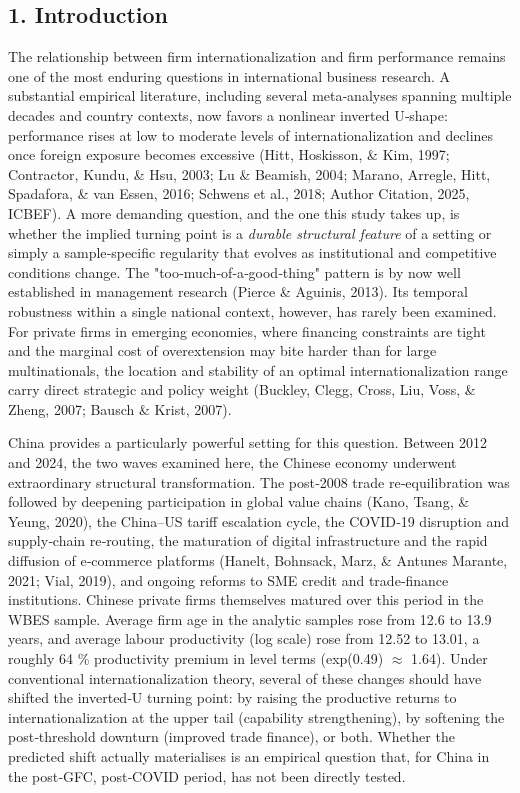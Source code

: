 \documentclass[12pt,a4paper]{article}
\begin{document}
\hypertarget{1-introduction}{%
\subsection{1. Introduction}\label{1-introduction}}

The relationship between firm internationalization and firm performance
remains one of the most enduring questions in international business
research. A substantial empirical literature, including several
meta‑analyses spanning multiple decades and country contexts, now favors
a nonlinear inverted U‑shape: performance rises at low to moderate
levels of internationalization and declines once foreign exposure
becomes excessive (Hitt, Hoskisson, \& Kim, 1997; Contractor, Kundu, \&
Hsu, 2003; Lu \& Beamish, 2004; Marano, Arregle, Hitt, Spadafora, \& van
Essen, 2016; Schwens et al., 2018; Author Citation, 2025, ICBEF). A more
demanding question, and the one this study takes up, is whether the
implied turning point is a \emph{durable structural feature} of a
setting or simply a sample‑specific regularity that evolves as
institutional and competitive conditions change. The
"too‑much‑of‑a‑good‑thing" pattern is by now well established in
management research (Pierce \& Aguinis, 2013). Its temporal robustness
within a single national context, however, has rarely been examined. For
private firms in emerging economies, where financing constraints are
tight and the marginal cost of overextension may bite harder than for
large multinationals, the location and stability of an optimal
internationalization range carry direct strategic and policy weight
(Buckley, Clegg, Cross, Liu, Voss, \& Zheng, 2007; Bausch \& Krist,
2007).

China provides a particularly powerful setting for this question.
Between 2012 and 2024, the two waves examined here, the Chinese economy
underwent extraordinary structural transformation. The post‑2008 trade
re‑equilibration was followed by deepening participation in global value
chains (Kano, Tsang, \& Yeung, 2020), the China--US tariff escalation
cycle, the COVID‑19 disruption and supply‑chain re‑routing, the
maturation of digital infrastructure and the rapid diffusion of
e‑commerce platforms (Hanelt, Bohnsack, Marz, \& Antunes Marante, 2021;
Vial, 2019), and ongoing reforms to SME credit and trade‑finance
institutions. Chinese private firms themselves matured over this period
in the WBES sample. Average firm age in the analytic samples rose from
12.6 to 13.9 years, and average labour productivity (log scale) rose
from 12.52 to 13.01, a roughly 64 \% productivity premium in level terms
(exp(0.49) \(\approx\) 1.64). Under conventional internationalization
theory, several of these changes should have shifted the inverted‑U
turning point: by raising the productive returns to internationalization
at the upper tail (capability strengthening), by softening the
post‑threshold downturn (improved trade finance), or both. Whether the
predicted shift actually materialises is an empirical question that, for
China in the post‑GFC, post‑COVID period, has not been directly tested.
\end{document}
